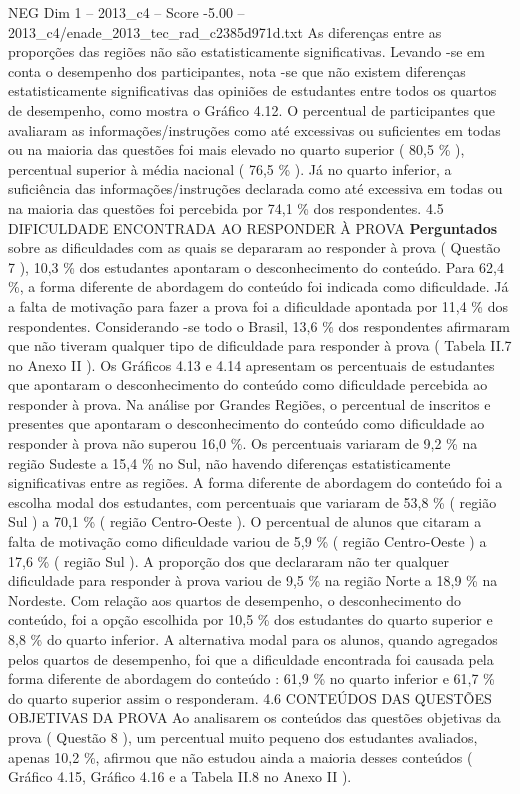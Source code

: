 \begin{textsample}{NEG Dim 1 – 2013\_c4 – Score -5.00 – 2013\_c4/enade\_2013\_tec\_rad\_c2385d971d.txt}
As diferenças entre as proporções das regiões não são estatisticamente significativas.
Levando -se em conta o desempenho dos participantes, nota -se que não existem diferenças estatisticamente significativas das opiniões de estudantes entre todos os quartos de desempenho, como mostra o Gráfico 4.12.
O percentual de participantes que avaliaram as informações/instruções como até excessivas ou suficientes em todas ou na maioria das questões foi mais elevado no quarto superior ( 80,5 \% ), percentual superior à média nacional ( 76,5 \% ).
Já no quarto inferior, a suficiência das informações/instruções declarada como até excessiva em todas ou na maioria das questões foi percebida por 74,1 \% dos respondentes. 4.5 DIFICULDADE ENCONTRADA AO RESPONDER À PROVA \textbf{Perguntados} sobre as dificuldades com as quais se depararam ao responder à prova ( Questão 7 ), 10,3 \% dos estudantes apontaram o desconhecimento do conteúdo.
Para 62,4 \%, a forma diferente de abordagem do conteúdo foi indicada como dificuldade.
Já a falta de motivação para fazer a prova foi a dificuldade apontada por 11,4 \% dos respondentes.
Considerando -se todo o Brasil, 13,6 \% dos respondentes afirmaram que não tiveram qualquer tipo de dificuldade para responder à prova ( Tabela II.7 no Anexo II ).
Os Gráficos 4.13 e 4.14 apresentam os percentuais de estudantes que apontaram o desconhecimento do conteúdo como dificuldade percebida ao responder à prova.
Na análise por Grandes Regiões, o percentual de inscritos e presentes que apontaram o desconhecimento do conteúdo como dificuldade ao responder à prova não superou 16,0 \%.
Os percentuais variaram de 9,2 \% na região Sudeste a 15,4 \% no Sul, não havendo diferenças estatisticamente significativas entre as regiões.
A forma diferente de abordagem do conteúdo foi a escolha modal dos estudantes, com percentuais que variaram de 53,8 \% ( região Sul ) a 70,1 \% ( região Centro-Oeste ).
O percentual de alunos que citaram a falta de motivação como dificuldade variou de 5,9 \% ( região Centro-Oeste ) a 17,6 \% ( região Sul ).
A proporção dos que declararam não ter qualquer dificuldade para responder à prova variou de 9,5 \% na região Norte a 18,9 \% na Nordeste.
Com relação aos quartos de desempenho, o desconhecimento do conteúdo, foi a opção escolhida por 10,5 \% dos estudantes do quarto superior e 8,8 \% do quarto inferior.
A alternativa modal para os alunos, quando agregados pelos quartos de desempenho, foi que a dificuldade encontrada foi causada pela forma diferente de abordagem do conteúdo : 61,9 \% no quarto inferior e 61,7 \% do quarto superior assim o responderam. 4.6 CONTEÚDOS DAS QUESTÕES OBJETIVAS DA PROVA Ao analisarem os conteúdos das questões objetivas da prova ( Questão 8 ), um percentual muito pequeno dos estudantes avaliados, apenas 10,2 \%, afirmou que não estudou ainda a maioria desses conteúdos ( Gráfico 4.15, Gráfico 4.16 e a Tabela II.8 no Anexo II ).

\end{textsample}
